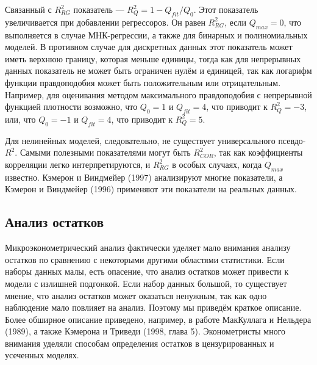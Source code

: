 Связанный с $R_{RG}^2$ показатель --- $R_{Q}^2 = 1 - Q_{fit}/Q_0$. Этот показатель увеличивается при добавлении регрессоров. Он равен $R_{RG}^2$, если $Q_{max} = 0$, что выполняется в случае МНК-регрессии, а также для бинарных и полиномиальных моделей. В противном случае для дискретных данных этот показатель может иметь верхнюю границу, которая меньше единицы, тогда как для непрерывных данных показатель не может быть ограничен нулём и единицей, так как логарифм функции правдоподобия может быть положительным или отрицательным. Например, для оценивания методом максимального правдоподобия с непрерывной функцией плотности возможно, что $Q_0 = 1$ и $Q_{fit} = 4$, что приводит к $R_Q^2 = -3$, или, что $Q_0 = - 1$ и $Q_{fit} = 4$, что приводит к $R_Q^2 = 5$.

Для нелинейных моделей, следовательно, не существует универсального псевдо-$R^2$. Самыми полезными показателями могут быть $R_{COR}^2$, так как коэффициенты корреляции легко интерпретируются, и $R_{RG}^2$ в особых случаях, когда $Q_{max}$ известно. Кэмерон и Виндмейер (1997) анализируют многие показатели, а Кэмерон и Виндмейер (1996) применяют эти показатели на реальных данных.

\subsection{Анализ остатков}

Микроэконометрический анализ фактически уделяет мало внимания анализу остатков по сравнению с некоторыми другими областями статистики. Если наборы данных малы, есть опасение, что анализ остатков может привести к модели с излишней подгонкой. Если набор данных большой, то существует мнение, что анализ остатков может оказаться ненужным, так как одно наблюдение мало повлияет на анализ. Поэтому мы приведём краткое описание. Более обширное описание приведено, например, в работе МакКуллага и Нельдера (1989), а также Кэмерона и Триведи (1998, глава 5). Эконометристы много внимания уделяли способам  определения остатков в цензурированных и усеченных моделях.

